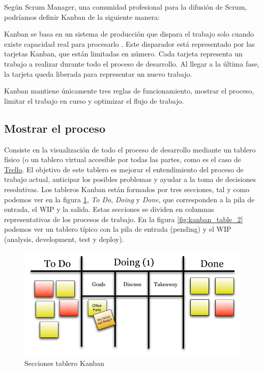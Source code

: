 Según Scrum Manager, una comunidad profesional para la difusión de Scrum, podríamos definir Kanban \cite{Pal15} de la siguiente manera:


Kanban se basa en un sistema de producción que dispara el trabajo solo cuando existe capacidad real para procesarlo \cite{Bahi11}. Este disparador está representado por las tarjetas Kanban, que están limitadas en número. Cada tarjeta representa un trabajo a realizar durante todo el proceso de desarrollo. Al llegar a la última fase, la tarjeta queda liberada para representar un nuevo trabajo.

Kanban mantiene únicamente tres reglas de funcionamiento, mostrar el proceso, limitar el trabajo en curso y optimizar el flujo de trabajo.

	\subsection{Mostrar el proceso}
	Consiste en la visualización de todo el proceso de desarrollo mediante un tablero físico (o un tablero virtual accesible por todas las partes, como es el caso de \href{https://trello.com/}{Trello}. El objetivo de este tablero es mejorar el entendimiento del proceso de trabajo actual, anticipar los posibles problemas y ayudar a la toma de decisiones resolutivas.
	Los tableros Kanban están formados por tres secciones, tal y como podemos ver en la figura \ref{fig:kanban_table_1}, \textit{To Do}, \textit{Doing} y \textit{Done}, que corresponden a la pila de entrada, el \ac{WIP} y la salida. Estas secciones se dividen en columnas representativas de los procesos de trabajo. En la figura \ref{fig:kanban_table_2} podemos ver un tablero típico con la pila de entrada (pending) y el \ac{WIP} (analysis, development, test y deploy).
	
	\begin{figure}[H]
	\centering
	\includegraphics[width=120mm, fbox={\fboxrule} 4mm]{images/04-metodo/02-kanban_table_1.png}
	\caption{Secciones tablero Kanban}
	\label{fig:kanban_table_1}
	\end{figure}
	
